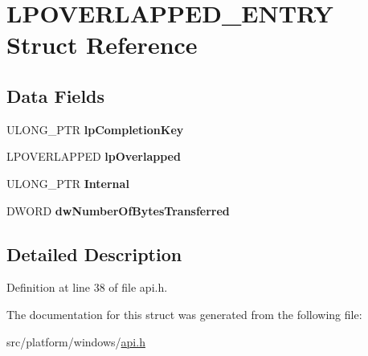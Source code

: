 \hypertarget{structOVERLAPPED__ENTRY}{\section{L\-P\-O\-V\-E\-R\-L\-A\-P\-P\-E\-D\-\_\-\-E\-N\-T\-R\-Y Struct Reference}
\label{structOVERLAPPED__ENTRY}
}
\subsection*{Data Fields}
\begin{DoxyCompactItemize}
\item 
\hypertarget{structOVERLAPPED__ENTRY_acc0f0376759d2fee4f20c2f5fb81e6b6}{U\-L\-O\-N\-G\-\_\-\-P\-T\-R {\bfseries lp\-Completion\-Key}}\label{structOVERLAPPED__ENTRY_acc0f0376759d2fee4f20c2f5fb81e6b6}

\item 
\hypertarget{structOVERLAPPED__ENTRY_a3074145b0cf48f9d89df0d6fa67d4dd7}{L\-P\-O\-V\-E\-R\-L\-A\-P\-P\-E\-D {\bfseries lp\-Overlapped}}\label{structOVERLAPPED__ENTRY_a3074145b0cf48f9d89df0d6fa67d4dd7}

\item 
\hypertarget{structOVERLAPPED__ENTRY_a4014e99118990de19cad8c5d12702aae}{U\-L\-O\-N\-G\-\_\-\-P\-T\-R {\bfseries Internal}}\label{structOVERLAPPED__ENTRY_a4014e99118990de19cad8c5d12702aae}

\item 
\hypertarget{structOVERLAPPED__ENTRY_ab8e5b912916d7e49efbda9bf4f6de458}{D\-W\-O\-R\-D {\bfseries dw\-Number\-Of\-Bytes\-Transferred}}\label{structOVERLAPPED__ENTRY_ab8e5b912916d7e49efbda9bf4f6de458}

\end{DoxyCompactItemize}


\subsection{Detailed Description}


Definition at line 38 of file api.\-h.



The documentation for this struct was generated from the following file\-:\begin{DoxyCompactItemize}
\item 
src/platform/windows/\hyperlink{api_8h}{api.\-h}\end{DoxyCompactItemize}
